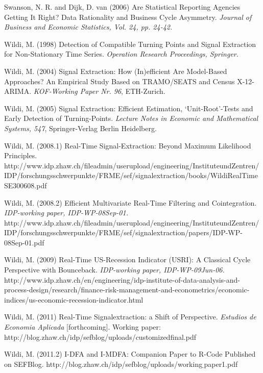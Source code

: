\documentclass[11pt]{article}
\begin{document}
\begin{thebibliography}{99}
\bibitem{} Swanson, N. R. and Dijk, D. van (2006)  Are Statistical Reporting Agencies
Getting It Right? Data Rationality and Business Cycle Asymmetry. {\it
Journal
of Business and Economic Statistics, Vol. 24, pp. 24-42.}




\bibitem{} Wildi, M. (1998)  Detection of Compatible Turning Points and Signal Extraction for Non-Stationary Time Series. {\it
Operation Research Proceedings, Springer.}



\bibitem{} Wildi, M. (2004)  Signal Extraction: How (In)efficient Are Model-Based Approaches?
An Empirical Study Based on TRAMO/SEATS and Census X-12-ARIMA. {\it
KOF-Working Paper Nr. 96}, ETH-Zurich.



\bibitem{} Wildi, M. (2005)  Signal Extraction: Efficient Estimation, `Unit-Root'-Tests and Early Detection of Turning-Points.
{\it Lecture Notes in Economic and Mathematical Systems, 547}, Springer-Verlag Berlin Heidelberg.
%

\bibitem{} Wildi, M. (2008.1) Real-Time Signal-Extraction: Beyond Maximum Likelihood
Principles.
http://www.idp.zhaw.ch/fileadmin/user\textunderscore upload/engineering/\textunderscore Institute\textunderscore und\textunderscore Zentren/IDP/forschungsschwerpunkte/FRME/sef/signalextraction/books/Wildi\textunderscore Real\textunderscore Time\textunderscore SE\textunderscore 300608.pdf

\bibitem{} Wildi, M. (2008.2) Efficient Multivariate Real-Time Filtering and
Cointegration. {\it IDP-working paper, IDP-WP-08Sep-01.}
http://www.idp.zhaw.ch/fileadmin/user\textunderscore upload/engineering/\textunderscore Institute\textunderscore und\textunderscore Zentren/IDP/forschungsschwerpunkte/FRME/sef/signalextraction/papers/IDP-WP-08Sep-01.pdf


\bibitem{} Wildi, M. (2009) Real-Time US-Recession Indicator (USRI):
A Classical Cycle Perspective with Bounceback. {\it IDP-working paper, IDP-WP-09Jun-06.}
http://www.idp.zhaw.ch/en/engineering/idp-institute-of-data-analysis-and-process-design/research/finance-risk-management-and-econometrics/economic-indices/us-economic-recession-indicator.html

\bibitem{} Wildi, M. (2011) Real-Time Signalextraction: a Shift of Perspective. {\it Estudios de Economia Aplicada} [forthcoming].
Working paper: http://blog.zhaw.ch/idp/sefblog/uploads/customized\textunderscore final.pdf


\bibitem{} Wildi, M. (2011.2) I-DFA and I-MDFA: Companion Paper to R-Code Published on
SEFBlog.  http://blog.zhaw.ch/idp/sefblog/uploads/working$\underline{~}$paper1.pdf

\end{thebibliography}


%
\end{document}
